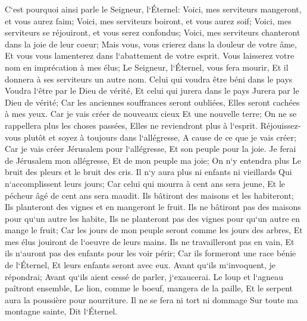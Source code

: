 \verse C`est pourquoi ainsi parle le Seigneur, l`Éternel: Voici, mes serviteurs mangeront, et vous aurez faim; Voici, mes serviteurs boiront, et vous aurez soif; Voici, mes serviteurs se réjouiront, et vous serez confondus; 
\verse Voici, mes serviteurs chanteront dans la joie de leur coeur; Mais vous, vous crierez dans la douleur de votre âme, Et vous vous lamenterez dans l`abattement de votre esprit. 
\verse Vous laisserez votre nom en imprécation à mes élus; Le Seigneur, l`Éternel, vous fera mourir, Et il donnera à ses serviteurs un autre nom. 
\verse Celui qui voudra être béni dans le pays Voudra l`être par le Dieu de vérité, Et celui qui jurera dans le pays Jurera par le Dieu de vérité; Car les anciennes souffrances seront oubliées, Elles seront cachées à mes yeux. 
\verse Car je vais créer de nouveaux cieux Et une nouvelle terre; On ne se rappellera plus les choses passées, Elles ne reviendront plus à l`esprit. 
\verse Réjouissez-vous plutôt et soyez à toujours dans l`allégresse, A cause de ce que je vais créer; Car je vais créer Jérusalem pour l`allégresse, Et son peuple pour la joie. 
\verse Je ferai de Jérusalem mon allégresse, Et de mon peuple ma joie; On n`y entendra plus Le bruit des pleurs et le bruit des cris. 
\verse Il n`y aura plus ni enfants ni vieillards Qui n`accomplissent leurs jours; Car celui qui mourra à cent ans sera jeune, Et le pécheur âgé de cent ans sera maudit. 
\verse Ils bâtiront des maisons et les habiteront; Ils planteront des vignes et en mangeront le fruit. 
\verse Ils ne bâtiront pas des maisons pour qu`un autre les habite, Ils ne planteront pas des vignes pour qu`un autre en mange le fruit; Car les jours de mon peuple seront comme les jours des arbres, Et mes élus jouiront de l`oeuvre de leurs mains. 
\verse Ils ne travailleront pas en vain, Et ils n`auront pas des enfants pour les voir périr; Car ils formeront une race bénie de l`Éternel, Et leurs enfants seront avec eux. 
\verse Avant qu`ils m`invoquent, je répondrai; Avant qu`ils aient cessé de parler, j`exaucerai. 
\verse Le loup et l`agneau paîtront ensemble, Le lion, comme le boeuf, mangera de la paille, Et le serpent aura la poussière pour nourriture. Il ne se fera ni tort ni dommage Sur toute ma montagne sainte, Dit l`Éternel. 

